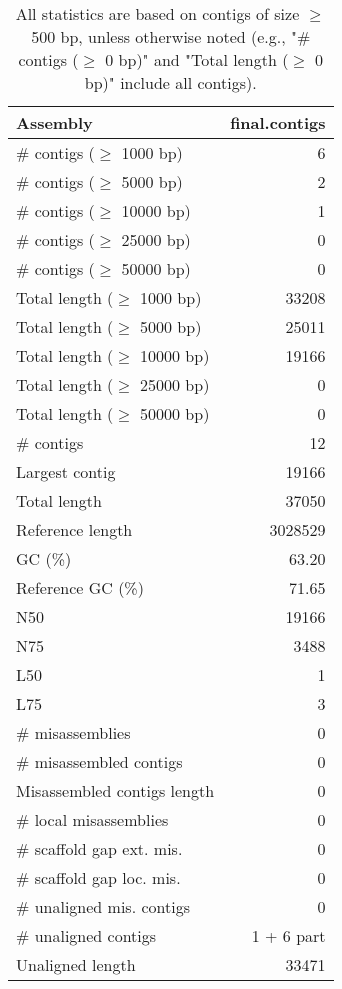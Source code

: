 \documentclass[12pt,a4paper]{article}
\begin{document}
\begin{table}[ht]
\begin{center}
\caption{All statistics are based on contigs of size $\geq$ 500 bp, unless otherwise noted (e.g., "\# contigs ($\geq$ 0 bp)" and "Total length ($\geq$ 0 bp)" include all contigs).}
\begin{tabular}{|l*{1}{|r}|}
\hline
Assembly & final.contigs \\ \hline
\# contigs ($\geq$ 1000 bp) & 6 \\ \hline
\# contigs ($\geq$ 5000 bp) & 2 \\ \hline
\# contigs ($\geq$ 10000 bp) & 1 \\ \hline
\# contigs ($\geq$ 25000 bp) & 0 \\ \hline
\# contigs ($\geq$ 50000 bp) & 0 \\ \hline
Total length ($\geq$ 1000 bp) & 33208 \\ \hline
Total length ($\geq$ 5000 bp) & 25011 \\ \hline
Total length ($\geq$ 10000 bp) & 19166 \\ \hline
Total length ($\geq$ 25000 bp) & 0 \\ \hline
Total length ($\geq$ 50000 bp) & 0 \\ \hline
\# contigs & 12 \\ \hline
Largest contig & 19166 \\ \hline
Total length & 37050 \\ \hline
Reference length & 3028529 \\ \hline
GC (\%) & 63.20 \\ \hline
Reference GC (\%) & 71.65 \\ \hline
N50 & 19166 \\ \hline
N75 & 3488 \\ \hline
L50 & 1 \\ \hline
L75 & 3 \\ \hline
\# misassemblies & 0 \\ \hline
\# misassembled contigs & 0 \\ \hline
Misassembled contigs length & 0 \\ \hline
\# local misassemblies & 0 \\ \hline
\# scaffold gap ext. mis. & 0 \\ \hline
\# scaffold gap loc. mis. & 0 \\ \hline
\# unaligned mis. contigs & 0 \\ \hline
\# unaligned contigs & 1 + 6 part \\ \hline
Unaligned length & 33471 \\ \hline

\end{tabular}
\end{center}
\end{table}
\end{document}
